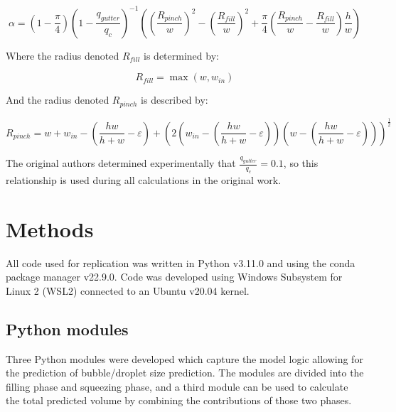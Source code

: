 \begin{equation}
  \alpha = \left(1 - \frac{\pi}{4}\right)
  \left(1 - \frac{q_{gutter}}{q_{c}}\right)^{-1}
  \left(\left(\frac{R_{pinch}}{w}\right)^2 -
  \left(\frac{R_{fill}}{w}\right)^2 +
  \frac{\pi}{4}\left(\frac{R_{pinch}}{w} -
  \frac{R_{fill}}{w}\right)\frac{h}{w}\right)\label{alpha}
\end{equation}

\noindent Where the radius denoted $R_{fill}$ is determined by:

\begin{equation}
  R_{fill} = \max\left(w,w_{in}\right)\label{R_fill}
\end{equation}

\noindent And the radius denoted $R_{pinch}$ is described by:

\begin{equation}
  R_{pinch} = w + w_{in} - \left(\frac{hw}{h+w} - \varepsilon\right) +
  \left(2\left(w_{in} -
    \left(\frac{hw}{h+w} -
    \varepsilon\right)\right)\left(w -
    \left(\frac{hw}{h+w} - \varepsilon\right)\right)\right)^\frac{1}{2}\label{R_pinch}
\end{equation}

\noindent The original authors determined experimentally that $\frac{q_{gutter}}{q_c}=0.1$,
so this relationship is used during all calculations in the original work.

\section{Methods}

All code used for replication was written in Python\supercite{pypi_python_nodate}
v3.11.0 and using the conda\supercite{noauthor_conda_2017} package manager v22.9.0.
Code was developed using Windows Subsystem for Linux 2 (WSL2)\supercite{microsoft_windows_nodate}
connected to an Ubuntu\supercite{canonical_ltd_ubuntu_2020} v20.04 kernel.

\subsection{Python modules}

Three Python modules were developed which capture the model logic allowing for the prediction of
bubble/droplet size prediction. The modules are divided into the filling phase and squeezing phase,
and a third module can be used to calculate the total predicted volume by combining the contributions
of those two phases.

